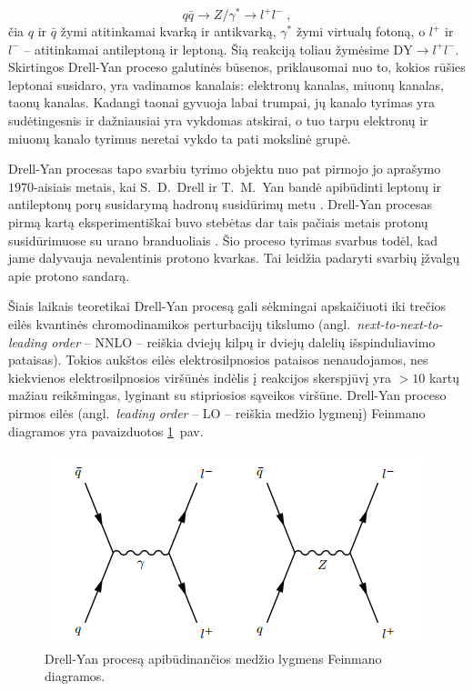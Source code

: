 \documentclass[a4paper, 12pt, oneside]{article}
\newcommand{\DY}{\mathrm{DY}}
\newlength\q
\begin{document}
\begin{equation*}
	q\bar{q} \rightarrow Z/ \gamma^{*} \rightarrow l^{+}l^{-} \; ,
\end{equation*}
čia $q$ ir $\bar{q}$ žymi atitinkamai kvarką ir antikvarką, $\gamma^*$ žymi virtualų fotoną, o $l^+$ ir $l^-$ -- atitinkamai
antileptoną ir leptoną.
Šią reakciją toliau žymėsime $\DY \! \rightarrow \! l^{+}l^{-}$.
Skirtingos Drell-Yan proceso galutinės būsenos, priklausomai nuo to, kokios rūšies leptonai susidaro, yra
vadinamos kanalais: elektronų kanalas, miuonų kanalas, taonų kanalas.
Kadangi taonai gyvuoja labai trumpai, jų kanalo tyrimas yra sudėtingesnis ir dažniausiai yra vykdomas atskirai,
o tuo tarpu elektronų ir miuonų kanalo tyrimus neretai vykdo ta pati mokslinė grupė.

Drell-Yan procesas tapo svarbiu tyrimo objektu nuo pat pirmojo jo aprašymo $1970$-aisiais
metais, kai S.~D.~Drell ir T.~M.~Yan bandė apibūdinti leptonų ir antileptonų porų susidarymą
hadronų susidūrimų metu \cite{DYoriginal}.
Drell-Yan procesas pirmą kartą eksperimentiškai buvo stebėtas dar tais pačiais metais protonų susidūrimuose
su urano branduoliais \cite{DY_firstExp}.
Šio proceso tyrimas svarbus todėl, kad jame dalyvauja nevalentinis protono kvarkas.
Tai leidžia padaryti svarbių įžvalgų apie protono sandarą.

Šiais laikais teoretikai Drell-Yan procesą gali sėkmingai apskaičiuoti iki trečios eilės
kvantinės chromodinamikos perturbacijų tikslumo (angl.\ \textit{next-to-next-to-leading order} -- NNLO --
reiškia dviejų kilpų ir dviejų dalelių išspinduliavimo pataisas).
Tokios aukštos eilės elektrosilpnosios pataisos nenaudojamos, nes kiekvienos elektrosilpnosios viršūnės
indėlis į reakcijos skerspjūvį yra $>10$ kartų mažiau reikšmingas, lyginant su stipriosios sąveikos viršūne.
Drell-Yan proceso pirmos eilės (angl.\ \textit{leading order} -- LO -- reiškia medžio lygmenį) Feinmano diagramos
yra pavaizduotos \ref{fig:DYfeyn}~pav.

\begin{figure}[t]
\centering
\includegraphics[scale=0.75]{DYprocess.PNG}
\caption{Drell-Yan procesą apibūdinančios medžio lygmens Feinmano diagramos.}
\label{fig:DYfeyn}
\end{figure}
\end{document}
